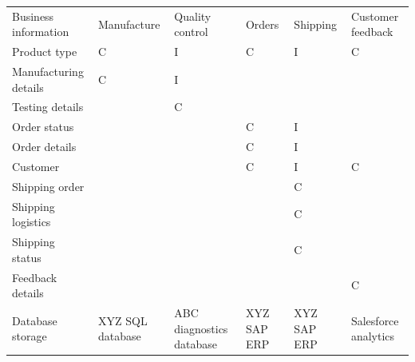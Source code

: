 \documentclass[10pt,openany,10pt]{book}
\newcounter{none}
\let\podeToprule\toprule
\let\podeMidrule\midrule
\let\podeBottomrule\bottomrule
\renewcommand{\toprule}{\arrayrulecolor{pbiGrid}\podeToprule}
\renewcommand{\midrule}{\arrayrulecolor{pbiGrid}\podeMidrule}
\renewcommand{\bottomrule}{\arrayrulecolor{pbiGrid}\podeBottomrule}
\begin{document}
{\def\LTcaptype{none} %
\begin{longtable}[]{@{}
  >{\raggedright\arraybackslash}p{}
  >{\raggedright\arraybackslash}p{}
  >{\raggedright\arraybackslash}p{}
  >{\raggedright\arraybackslash}p{}
  >{\raggedright\arraybackslash}p{}
  >{\raggedright\arraybackslash}p{}@{}}
\toprule\noalign{}
\begin{minipage}[b]{\linewidth}\raggedright
Business information
\end{minipage} & \begin{minipage}[b]{\linewidth}\raggedright
Manufacture
\end{minipage} & \begin{minipage}[b]{\linewidth}\raggedright
Quality control
\end{minipage} & \begin{minipage}[b]{\linewidth}\raggedright
Orders
\end{minipage} & \begin{minipage}[b]{\linewidth}\raggedright
Shipping
\end{minipage} & \begin{minipage}[b]{\linewidth}\raggedright
Customer feedback
\end{minipage} \\
\midrule\noalign{}
\endhead
\bottomrule\noalign{}
\endlastfoot
Product type & C & I & C & I & C \\
Manufacturing details & C & I & & & \\
Testing details & & C & & & \\
Order status & & & C & I & \\
Order details & & & C & I & \\
Customer & & & C & I & C \\
Shipping order & & & & C & \\
Shipping logistics & & & & C & \\
Shipping status & & & & C & \\
Feedback details & & & & & C \\
Database storage & XYZ SQL database & ABC diagnostics database & XYZ SAP
ERP & XYZ SAP ERP & Salesforce analytics \\
\end{longtable}
}
\end{document}
